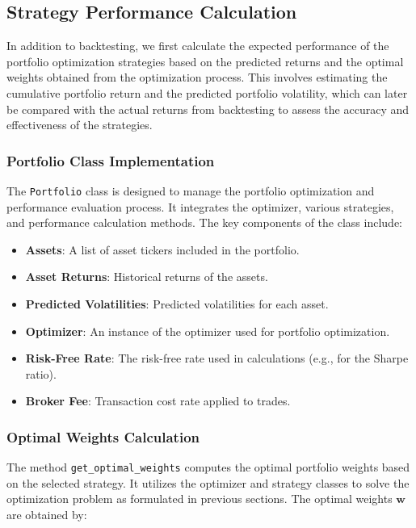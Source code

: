 \subsection{Strategy Performance Calculation}

In addition to backtesting, we first calculate the expected performance of the portfolio optimization strategies based on the predicted returns and the optimal weights obtained from the optimization process. This involves estimating the cumulative portfolio return and the predicted portfolio volatility, which can later be compared with the actual returns from backtesting to assess the accuracy and effectiveness of the strategies.

\subsubsection{Portfolio Class Implementation}

The \texttt{Portfolio} class is designed to manage the portfolio optimization and performance evaluation process. It integrates the optimizer, various strategies, and performance calculation methods. The key components of the class include:

\begin{itemize}
    \item \textbf{Assets}: A list of asset tickers included in the portfolio.
    \item \textbf{Asset Returns}: Historical returns of the assets.
    \item \textbf{Predicted Volatilities}: Predicted volatilities for each asset.
    \item \textbf{Optimizer}: An instance of the optimizer used for portfolio optimization.
    \item \textbf{Risk-Free Rate}: The risk-free rate used in calculations (e.g., for the Sharpe ratio).
    \item \textbf{Broker Fee}: Transaction cost rate applied to trades.
\end{itemize}

\subsubsection{Optimal Weights Calculation}

The method \texttt{get\_optimal\_weights} computes the optimal portfolio weights based on the selected strategy. It utilizes the optimizer and strategy classes to solve the optimization problem as formulated in previous sections. The optimal weights \( \mathbf{w} \) are obtained by:

